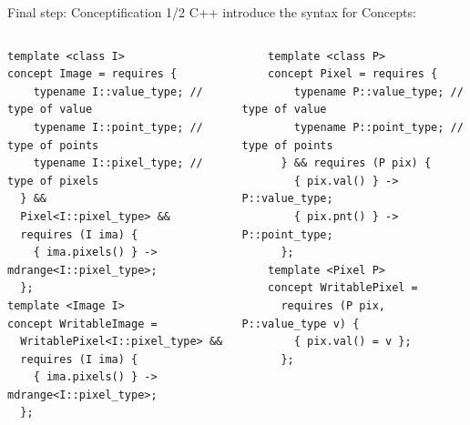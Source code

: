 \documentclass[12pt,aspectratio=169]{beamer}
\begin{document}
\begin{frame}[fragile]{Final step: Conceptification 1/2}
  C++ introduce the syntax for Concepts:
  \begin{columns}[T,onlytextwidth]
    \begin{verbatim}
template <class I>
concept Image = requires {
    typename I::value_type; // type of value
    typename I::point_type; // type of points
    typename I::pixel_type; // type of pixels
  } &&
  Pixel<I::pixel_type> &&
  requires (I ima) {
    { ima.pixels() } -> mdrange<I::pixel_type>;
  };
template <Image I>
concept WritableImage = 
  WritablePixel<I::pixel_type> &&
  requires (I ima) {
    { ima.pixels() } -> mdrange<I::pixel_type>;
  };
  \end{verbatim}

    \begin{verbatim}
    template <class P>
    concept Pixel = requires {
        typename P::value_type; // type of value
        typename P::point_type; // type of points
      } && requires (P pix) {
        { pix.val() } -> P::value_type;
        { pix.pnt() } -> P::point_type;
      };
    template <Pixel P>
    concept WritablePixel = 
      requires (P pix, P::value_type v) {
        { pix.val() = v };
      };
  \end{verbatim}
  \end{columns}
  \pdfcomment[icon=Note]{   }
  \pdfcomment[icon=Note]{   }
\end{frame}
\end{document}
